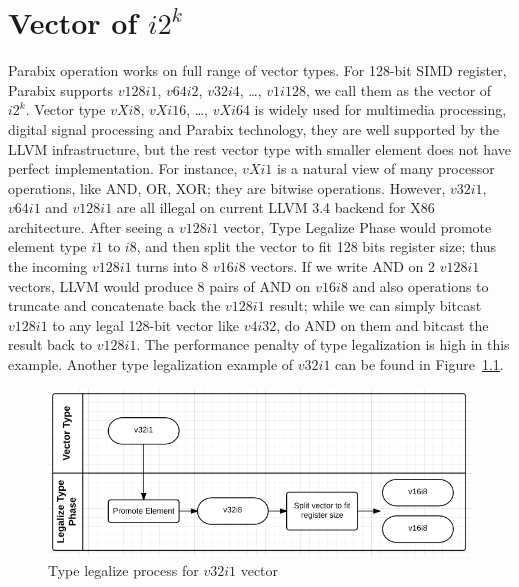 %
%

\chapter{Vector of $i2^k$}
\label{four}

Parabix operation works on full range of vector types. For 128-bit SIMD register, Parabix supports $v128i1$, $v64i2$, $v32i4$, \ldots, $v1i128$, we call them as the vector of $i2^k$. Vector type $vXi8$, $vXi16$, \ldots, $vXi64$ is widely used for multimedia processing, digital signal processing and Parabix technology, they are well supported by the LLVM infrastructure, but the rest vector type with smaller element does not have perfect implementation. For instance, $vXi1$ is a natural view of many processor operations, like AND, OR, XOR; they are bitwise operations. However, $v32i1$, $v64i1$ and $v128i1$ are all illegal on current LLVM 3.4 backend for X86 architecture. After seeing a $v128i1$ vector, Type Legalize Phase would promote element type $i1$ to $i8$, and then split the vector to fit 128 bits register size; thus the incoming $v128i1$ turns into 8 $v16i8$ vectors. If we write AND on 2 $v128i1$ vectors, LLVM would produce 8 pairs of AND on $v16i8$ and also operations to truncate and concatenate back the $v128i1$ result; while we can simply bitcast $v128i1$ to any legal 128-bit vector like $v4i32$, do AND on them and bitcast the result back to $v128i1$. The performance penalty of type legalization is high in this example. Another type legalization example of $v32i1$ can be found in Figure~\ref{figure:v32i1_legalize_type}.

\begin{figure}[ht!]
  \centering
  \includegraphics[width=140mm]{draw/v32i1_legalize_type.png}
  \caption{Type legalize process for $v32i1$ vector}
  \label{figure:v32i1_legalize_type}
\end{figure}

